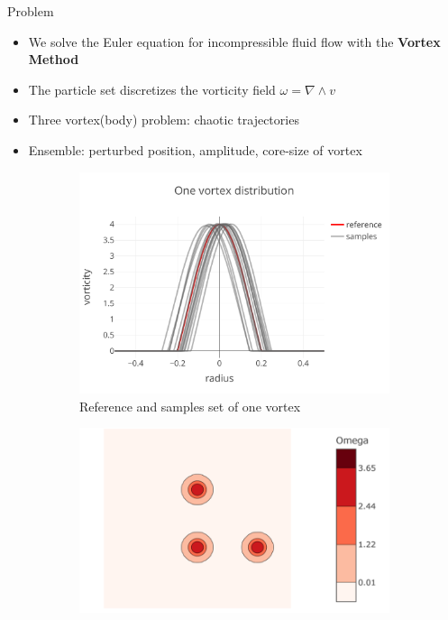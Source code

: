 \documentclass[aspectratio=169]{beamer} %
\begin{document}
\begin{frame}{Problem}
    \begin{itemize}
        \item We solve the Euler equation for incompressible fluid flow with the \textbf{Vortex Method}~\footnotemark[1]
        \item The particle set discretizes the vorticity field $\omega = \nabla \wedge v$
        \item Three vortex(body) problem: chaotic trajectories~\footnotemark[2]
        \item Ensemble: perturbed position, amplitude, core-size of vortex
    \end{itemize}

    \begin{figure}
        \begin{subfigure}[t]{0.32\textwidth}
            \centering
            \includegraphics[width=\textwidth]{images/vortex_distribution.pdf}
            \caption*{\tiny Reference and samples set of one vortex}
        \end{subfigure}
        \begin{subfigure}[t]{0.32\textwidth}
            \centering
            \includegraphics[width=\textwidth]{images/vorticity_field.png}

\end{subfigure}
\end{figure}
\end{frame}
\end{document}
